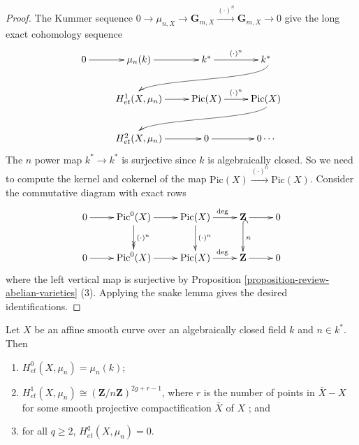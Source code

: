 \begin{proof}
The Kummer sequence $0\to \mu_{n, X} \to \mathbf{G}_{m, X}
\xrightarrow{(\cdot)^n} \mathbf{G}_{m, X}\to 0$ give the long exact cohomology
sequence
$$
\xymatrix{
0 \ar[r] & \mu_n(k) \ar[r] & k^* \ar^{(\cdot)^n}[r] & k^* \ar@(rd,ul)[rdllllr]
\\
& H_{et}^1(X, \mu_n) \ar[r] & \text{Pic}(X) \ar^{(\cdot)^n}[r] & \text{Pic} (X)
\ar@(rd,ul)[rdllllr] \\
& H_{et}^2(X, \mu_n) \ar[r] & 0 \ar[r] & 0 \cdots
}
$$
The $n$ power map $k^* \to k^*$ is surjective since $k$ is algebraically
closed. So we need to compute the kernel and cokernel of the map $\text{Pic}(X)
\xrightarrow{(\cdot)^n} \text{Pic}(X)$. Consider the commutative diagram with
exact rows
$$
\xymatrix{
0 \ar[r] & {\text{Pic}^0(X)} \ar[r] \ar^{(\cdot)^n}@{>>}[d] & {\text{Pic}(X)}
\ar^{\ \ \deg}[r] \ar^{(\cdot)^n}[d] & {\mathbf{Z}} \ar[r] \ar^{n}@{^{(}->}[d]
& 0\\
0 \ar[r] & {\text{Pic}^0(X)} \ar[r] & {\text{Pic}(X)} \ar^{\ \ \deg}[r] &
{\mathbf{Z}} \ar[r] & 0
}
$$
where the left vertical map is surjective by
Proposition \ref{proposition-review-abelian-varieties} (3).
Applying the snake lemma gives the desired identifications.
\end{proof}

\begin{lemma}
\label{lemma-vanishing-cohomology-mu-smooth-curve}
Let $X$ be an affine smooth curve over an algebraically closed field $k$ and
$n\in k^*$. Then
\begin{enumerate}
\item
$H_{et}^0(X, \mu_n) = \mu_n(k)$;
\item
$H_{et}^1(X, \mu_n) \cong \left(\mathbf{Z}/n\mathbf{Z}\right)^{2g+r-1}$, where
$r$ is the number of points in $\bar X - X$ for some smooth projective
compactification $\bar X$ of $X$ ; and
\item
for all $q\geq 2$, $H_{et}^q(X, \mu_n) = 0$.
\end{enumerate}
\end{lemma}


